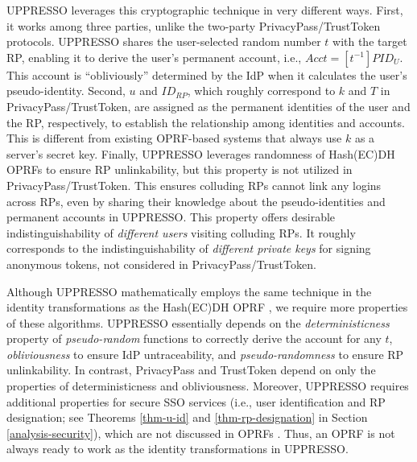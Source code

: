UPPRESSO leverages this cryptographic technique in very different ways.
First, 
it works among three parties, unlike the two-party PrivacyPass/TrustToken protocols.
UPPRESSO shares the user-selected random number $t$ with the target RP,
enabling it to derive the user's permanent account, i.e., $Acct = [t^{-1}]PID_{U}$. This account is ``obliviously'' determined by the IdP when it calculates the user's pseudo-identity.
Second, $u$ and $ID_{RP}$, which roughly correspond to $k$ and $T$ in PrivacyPass/TrustToken, are assigned as the permanent identities of the user and the RP, respectively, to establish the relationship among identities and accounts.
This is different from existing OPRF-based systems  \cite{privacypass, trusttoken, strong-oprf, oprf-bitcoin-wallet, pesto, oprf-ot-si, pp-ss, Private-Contact-Discovery, o-kms, oprf-deduplication} that always use $k$ as a server's secret key.
Finally, UPPRESSO leverages randomness of Hash(EC)DH OPRFs to ensure RP unlinkability, but this property is not utilized in PrivacyPass/TrustToken.
This ensures colluding RPs cannot link any logins across RPs,
even by sharing their knowledge about the pseudo-identities and permanent accounts in UPPRESSO.
This property offers desirable indistinguishability of \emph{different users} visiting colluding RPs.
It roughly corresponds to the indistinguishability of \emph{different private keys} for signing anonymous tokens, not considered in PrivacyPass/TrustToken. 

Although UPPRESSO mathematically employs the same technique in the identity transformations as the Hash(EC)DH OPRF \cite{oprf-proved,voprf-proved}, we require more properties of these algorithms. %
UPPRESSO essentially 
depends on the \emph{deterministicness} property of \emph{pseudo-random} functions to correctly derive the account for any $t$, \emph{obliviousness} to ensure IdP untraceability, 
and \emph{pseudo-randomness} to ensure RP unlinkability. 
In contrast, PrivacyPass and TrustToken \cite{privacypass,trusttoken} depend on only the properties of deterministicness and obliviousness.
Moreover, UPPRESSO requires additional properties for secure SSO services (i.e., user identification and RP designation; see Theorems \ref{thm-u-id} and \ref{thm-rp-designation} in Section \ref{analysis-security}),
    which are not discussed in OPRFs \cite{sok-oprf,oprf-proved,voprf-proved}.
Thus, an OPRF is not always ready to work as the identity transformations in UPPRESSO.

